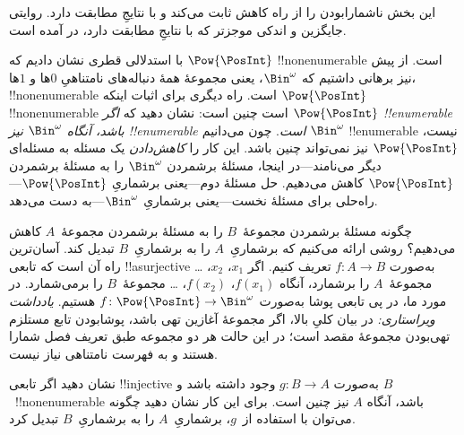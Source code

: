 \documentclass[../../../include/open-logic-section]{subfiles}
\begin{document}


\begin{editorial}
  این بخش ناشمارابودن را از راه کاهش ثابت می‌کند و با نتایجِ
   مطابقت دارد. روایتی جایگزین و اندکی موجزتر که با
  نتایجِ  مطابقت دارد، در 
  آمده است.
\end{editorial}

با استدلالی قطری نشان دادیم که $\Pow{\PosInt}$ !!{nonenumerable} است.
از پیش نیز برهانی داشتیم که $\Bin^\omega$، یعنی مجموعهٔ همهٔ
دنباله‌های نامتناهیِ $0$ها و $1$ها، !!{nonenumerable} است. راه دیگری
برای اثبات اینکه $\Pow{\PosInt}$ !!{nonenumerable} است چنین است: نشان دهید
که \emph{اگر $\Pow{\PosInt}$ !!{enumerable} باشد، آنگاه $\Bin^\omega$
  نیز !!{enumerable} است}. چون می‌دانیم $\Bin^\omega$ !!{enumerable}
نیست، $\Pow{\PosInt}$ نیز نمی‌تواند چنین باشد. این کار را
\emph{کاهش‌دادن} یک مسئله به مسئله‌ای دیگر می‌نامند---در اینجا، مسئلهٔ
برشمردن $\Bin^\omega$ را به مسئلهٔ برشمردن $\Pow{\PosInt}$ کاهش
می‌دهیم. حل مسئلهٔ دوم---یعنی برشماریِ $\Pow{\PosInt}$---راه‌حلی برای
مسئلهٔ نخست---یعنی برشماریِ $\Bin^\omega$---به دست می‌دهد.

چگونه مسئلهٔ برشمردن مجموعهٔ~$B$ را به مسئلهٔ برشمردن مجموعهٔ~$A$
کاهش می‌دهیم؟ روشی ارائه می‌کنیم که برشماریِ~$A$ را به برشماریِ~$B$
تبدیل کند. آسان‌ترین راه آن است که تابعی !!a{surjective} به‌صورت
$f\colon A \to B$ تعریف کنیم. اگر $x_1$، $x_2$، \dots{} مجموعهٔ~$A$ را
برشمارد، آنگاه $f(x_1)$، $f(x_2)$، \dots{} مجموعهٔ~$B$ را برمی‌شمارد.
در مورد ما، در پی تابعی پوشا به‌صورت
$f\colon \Pow{\PosInt} \to \Bin^\omega$ هستیم.
\emph{یادداشت ویراستاری:} در بیان کلیِ بالا، اگر مجموعهٔ آغازین تهی باشد،
پوشابودن تابع مستلزم تهی‌بودن مجموعهٔ مقصد است؛ در این حالت هر دو مجموعه
طبق تعریف فصل شمارا هستند و به فهرست نامتناهی نیاز نیست.

\begin{prob}
نشان دهید اگر تابعی !!{injective} به‌صورت $g\colon B \to A$ وجود داشته
باشد و $B$~!!{nonenumerable} باشد، آنگاه $A$ نیز چنین است. برای این
کار نشان دهید چگونه می‌توان با استفاده از~$g$، برشماریِ~$A$ را به
برشماریِ~$B$ تبدیل کرد.
\end{prob}
\end{document}
